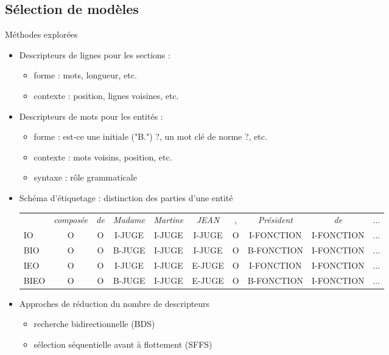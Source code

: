 \subsection{Sélection de modèles}
\begin{frame}[t]{\mysubsectiontitle}		
	Méthodes explorées
	
	\begin{itemize} \small
		\item Descripteurs de lignes pour les sections : 
		 \begin{itemize}
			\item forme : mots, longueur, etc. 
			\item contexte : position, lignes voisines, etc.
		 \end{itemize}
		\item Descripteurs de mots pour les entités : 
		\begin{itemize}
			\item forme : est-ce une initiale ("B.") ?,  un mot clé de norme ?, etc.
			\item contexte : mots voisins, position, etc.
			\item syntaxe : rôle grammaticale
		\end{itemize}
		\item Schéma d'étiquetage : distinction des parties d'une entité {\tiny
		\begin{tabular}{l|ccccccccc}
			& \textit{composée} & \textit{de} & \textit{Madame} & \textit{Martine} & \textit{JEAN} & , & \textit{Président} & \textit{de} & ... \\ 
			IO & O & O & I-JUGE & I-JUGE & I-JUGE & O & I-FONCTION & I-FONCTION & ... \\
			BIO & O & O & B-JUGE & I-JUGE & I-JUGE & O & B-FONCTION & I-FONCTION & ... \\
			IEO & O & O & I-JUGE & I-JUGE & E-JUGE & O & I-FONCTION & I-FONCTION & ...\\
			BIEO & O & O & B-JUGE & I-JUGE & E-JUGE & O & B-FONCTION & I-FONCTION & ... \\
		\end{tabular}}
		\item Approches de réduction du nombre de descripteurs
		\begin{itemize}
			\item recherche bidirectionnelle (BDS)
			\item sélection séquentielle avant à flottement (SFFS)
		\end{itemize}
	\end{itemize}	
\end{frame}

